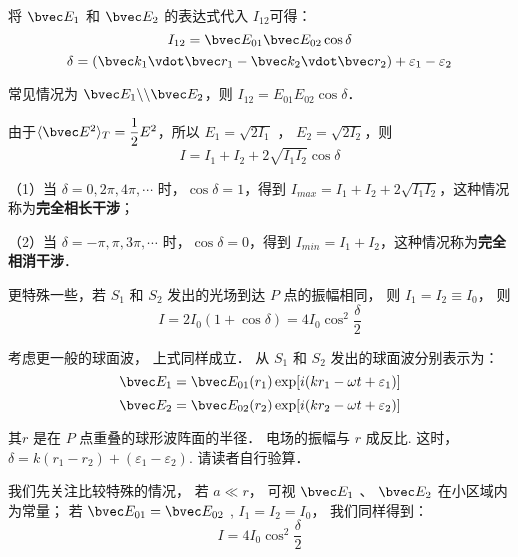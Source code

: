 将 $\bvec E_1$ 和 $ \bvec E_2$ 的表达式代入 $I_{12}$可得：
$$I_{12} = \bvec E_{01}\bvec E_{02} \cos\delta$$
$$\delta = (\bvec k_1 \vdot \bvec r_1 - \bvec k_2 \vdot \bvec r_2 ) + \varepsilon_1 - \varepsilon_2 $$

常见情况为 $\bvec E_1 \backslash\backslash\bvec E_2$，则 $ I_{12} = E_{01} E_{02}\cos\delta$．

由于$\langle \bvec E^2 \rangle _T = \dfrac{1}{2}E^2$，所以 $ E_1 = \sqrt{2I_1}$ ，  $ E_2 = \sqrt{2I_2}$，则
$$  I = I_1 + I_2 + 2\sqrt{I_1 I_2}\cos\delta$$

（1）当 $\delta = 0, 2\pi, 4\pi, \cdots$ 时，$\cos \delta = 1$，得到 $ I_{max} = I_1 + I_2 +2\sqrt{I_1 I_2}$，这种情况称为\textbf{完全相长干涉}；

（2）当 $\delta = -\pi, \pi, 3\pi, \cdots$ 时，$\cos \delta = 0$，得到 $ I_{min} = I_1 + I_2 $，这种情况称为\textbf{完全相消干涉}．

更特殊一些，若 $S_1$ 和 $S_2$ 发出的光场到达 $ P $ 点的振幅相同， 则 $ I_1 = I_2 \equiv I_0$， 则
$$ I = 2 I_0 ( 1 + \cos\delta ) = 4 I_0 \cos ^2\dfrac { \delta } { 2 } $$

考虑更一般的球面波， 上式同样成立． 从 $ S_1 $ 和 $ S_2 $ 发出的球面波分别表示为：
$$ \bvec E_1 = \bvec E_{ 01 } ( r_1 ) \exp[ i( k r_1 - \omega t+ \varepsilon_1 )]$$
$$ \bvec E_2 = \bvec E_{ 02 } ( r_2 ) \exp[ i( k r_2 - \omega t+ \varepsilon_2 )]$$

其$ r $ 是在 $ P $ 点重叠的球形波阵面的半径． 电场的振幅与 $ r $ 成反比. 这时， $ \delta = k ( r_1 - r_2 ) + ( \varepsilon_1 - \varepsilon_2 )$.  请读者自行验算．

我们先关注比较特殊的情况， 若 $ a \ll r $， 可视 $ \bvec E_1$ 、 $ \bvec E_2$ 在小区域内为常量； 若 $ \bvec E_{01} = \bvec E_{02} $ , $ I_1 = I_2 = I_0 $， 我们同样得到：
$$ I = 4 I_0 \cos ^2\dfrac { \delta } { 2 }$$




